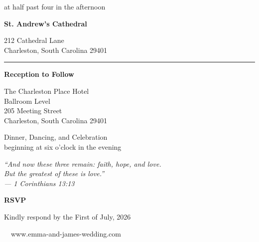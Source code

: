 \documentclass[
    language=english,
    doctype=wedding-invitation,
    institution=none,
]{../../omnilatex}
\begin{document}
\begin{center}
    {\fontsize{18}{22}\selectfont\color{black!80}%
    at half past four in the afternoon}

    \vspace{1.5cm}

    {\large\bfseries\color{black!80}%
    St. Andrew's Cathedral}

    \vspace{0.3cm}

    {\large\color{black!70}%
    212 Cathedral Lane\\
    Charleston, South Carolina 29401}

    \vspace{2cm}

    \noindent\rule{0.3\textwidth}{0.4pt}

    \vspace{1.5cm}

    {\large\bfseries\color{black!80}%
    Reception to Follow}

    \vspace{0.5cm}

    {\large\color{black!70}%
    The Charleston Place Hotel\\
    Ballroom Level\\
    205 Meeting Street\\
    Charleston, South Carolina 29401}

    \vspace{1cm}

    {\large\color{black!70}%
    Dinner, Dancing, and Celebration\\
    beginning at six o'clock in the evening}

    \vspace{2cm}

    {\large\itshape\color{black!70}%
    ``And now these three remain: faith, hope, and love.\\
    But the greatest of these is love.''\\
    --- 1 Corinthians 13:13}

    \vspace{2cm}

    {\large\bfseries\color{gold!60!brown}RSVP}

    \vspace{0.5cm}

    {\color{black!70}%
    Kindly respond by the First of July, 2026}

    \vspace{0.3cm}

    {\color{black!70}%
    \faGlobe\ \ www.emma-and-james-wedding.com}


\end{center}
\end{document}
